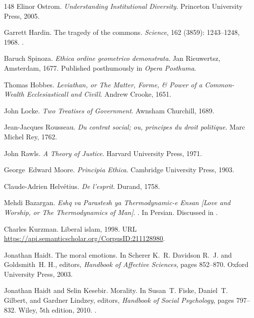 \documentclass[11pt]{article}
\theoremstyle{plain}
\theoremstyle{definition}
\theoremstyle{remark}
\begin{document}
\begin{thebibliography}{148}
Elinor Ostrom.
\newblock \emph{Understanding Institutional Diversity}.
\newblock Princeton University Press, 2005.

Garrett Hardin.
\newblock The tragedy of the commons.
\newblock \emph{Science}, 162 (3859): 1243--1248, 1968.
\newblock {}.

Baruch Spinoza.
\newblock \emph{Ethica ordine geometrico demonstrata}.
\newblock Jan Rieuwertsz, Amsterdam, 1677.
\newblock Published posthumously in \emph{Opera Posthuma}.

Thomas Hobbes.
\newblock \emph{Leviathan, or The Matter, Forme, \& Power of a Common-Wealth
  Ecclesiasticall and Civill}.
\newblock Andrew Crooke, 1651.

John Locke.
\newblock \emph{Two Treatises of Government}.
\newblock Awnsham Churchill, 1689.

Jean-Jacques Rousseau.
\newblock \emph{Du contrat social; ou, principes du droit politique}.
\newblock Marc Michel Rey, 1762.

John Rawls.
\newblock \emph{A Theory of Justice}.
\newblock Harvard University Press, 1971.

George~Edward Moore.
\newblock \emph{Principia Ethica}.
\newblock Cambridge University Press, 1903.

Claude-Adrien Helv{\'e}tius.
\newblock \emph{De l'esprit}.
\newblock Durand, 1758.

Mehdi Bazargan.
\newblock \emph{Eshq va Parastesh ya Thermodynamic-e Ensan [Love and Worship,
  or The Thermodynamics of Man]}.
.
\newblock In Persian. Discussed in \cite{Kurzman1998}.

Charles Kurzman.
\newblock Liberal islam, 1998.
\newblock URL \url{https://api.semanticscholar.org/CorpusID:211128980}.

Jonathan Haidt.
\newblock The moral emotions.
\newblock In Scherer K.~R. Davidson R.~J. and Goldsmith~H. H., editors,
  \emph{Handbook of Affective Sciences}, pages 852--870. Oxford University
  Press, 2003.

Jonathan Haidt and Selin Kesebir.
\newblock Morality.
\newblock In Susan~T. Fiske, Daniel~T. Gilbert, and Gardner Lindzey, editors,
  \emph{Handbook of Social Psychology}, pages 797--832. Wiley, 5th edition,
  2010.
\newblock {}.


\end{thebibliography}
\end{document}
